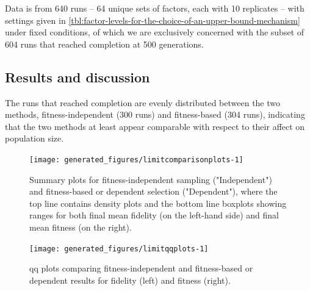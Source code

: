 Data is from 640 runs -- 64 unique sets of factors, each with 10 replicates -- with settings given in \cref{tbl:factor-levels-for-the-choice-of-an-upper-bound-mechanism} under fixed conditions, of which we are exclusively concerned with the subset of 604 runs that reached completion at 500 generations.

\subsection{Results and discussion}

The runs that reached completion are evenly distributed between the two methods, fitness-independent (300 runs) and fitness-based (304 runs), indicating that the two methods at least appear comparable with respect to their affect on population size.

\begin{knitrout}
\color{fgcolor}\begin{figure}[htp]
\texttt{[image: generated\_figures/limitcomparisonplots-1]} \caption[Summary plots for fitness-independent sampling ("Independent") and fitness-based or dependent selection ("Dependent"), where the top line contains density plots and the bottom line boxplots showing ranges for both final mean fidelity (on the left-hand side) and final mean fitness (on the right)]{Summary plots for fitness-independent sampling ("Independent") and fitness-based or dependent selection ("Dependent"), where the top line contains density plots and the bottom line boxplots showing ranges for both final mean fidelity (on the left-hand side) and final mean fitness (on the right).}\label{fig:limitcomparisonplots}
\end{figure}


\end{knitrout}

\begin{knitrout}
\color{fgcolor}\begin{figure}[htp]
\texttt{[image: generated\_figures/limitqqplots-1]} \caption[\Gls{qq} plots comparing fitness-independent and fitness-based or dependent results for fidelity (left) and fitness (right)]{\Gls{qq} plots comparing fitness-independent and fitness-based or dependent results for fidelity (left) and fitness (right).}\label{fig:limitqqplots}
\end{figure}


\end{knitrout}

